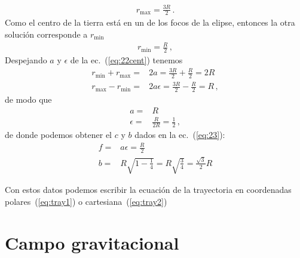 \begin{itemize}
\begin{frame}
\begin{align}
  r_{\text{max}}=\frac{3R}{2}\,.
\end{align}
Como el centro de la tierra está en un de los focos de la elipse, entonces la otra solución corresponde a $r_{\text{min}}$
\begin{align}
  r_{\text{min}}=\frac{R}{2}\,,
\end{align}
Despejando $a$ y $\epsilon$ de la ec.~(\ref{eq:22cent}) tenemos
\begin{align}
  r_{\text{min}}+r_{\text{max}}=&2a=\frac{3R}{2}+\frac{R}{2}=2R\nonumber\\
  r_{\text{max}}-r_{\text{min}}=&2a\epsilon=\frac{3R}{2}-\frac{R}{2}=R\,,
\end{align}
de modo que
\begin{align}
  a=&R\nonumber\\
  \epsilon=&\frac{R}{2R}=\frac{1}{2}\,,
\end{align}
de donde podemos obtener el $c$ y $b$ dados en la ec.~(\ref{eq:23}):
\begin{align*}
  f=&a\epsilon=\frac{R}{2}\nonumber\\
  b=&R\sqrt{1-\frac{1}{4}}=R\sqrt{\frac{3}{4}}=\frac{\sqrt{3}}{2}R
\end{align*}

Con estos datos podemos escribir la ecuación de la trayectoria en coordenadas polares~(\ref{eq:tray1}) o cartesiana~(\ref{eq:tray2})

\end{frame}

\end{itemize}



\section{Campo gravitacional}

